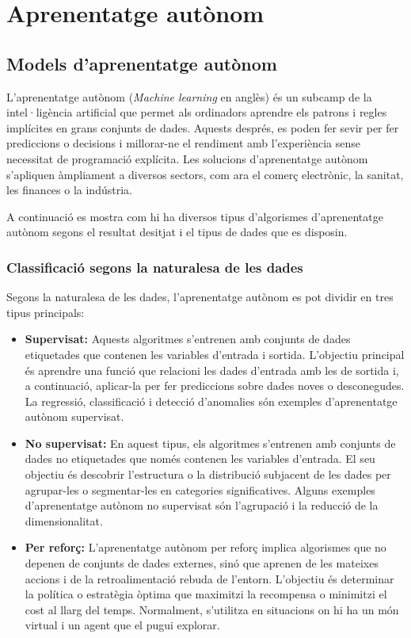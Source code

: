 \section{Aprenentatge autònom}

\subsection{Models d'aprenentatge autònom}
L'aprenentatge autònom (\textit{Machine learning} en anglès) és un subcamp de la intel·ligència artificial que permet als ordinadors aprendre els patrons i regles implícites en grans conjunts de dades. Aquests després, es poden fer sevir per fer prediccions o decisions i millorar-ne el rendiment amb l'experiència sense necessitat de programació explícita. Les solucions d'aprenentatge autònom s'apliquen àmpliament a diversos sectors, com ara el comerç electrònic, la sanitat, les finances o la indústria.

A continuació es mostra com hi ha diversos tipus d'algorismes d'aprenentatge autònom segons el resultat desitjat i el tipus de dades que es disposin.

\subsubsection{Classificació segons la naturalesa de les dades}
Segons la naturalesa de les dades, l'aprenentatge autònom es pot dividir en tres tipus principals: 
\begin{itemize}
    \item \textbf{Supervisat:} Aquests algoritmes s'entrenen amb conjunts de dades etiquetades que contenen les variables d'entrada i sortida. L'objectiu principal és aprendre una funció que relacioni les dades d'entrada amb les de sortida i, a continuació, aplicar-la per fer prediccions sobre dades noves o desconegudes. La regressió, classificació i detecció d'anomalies són exemples d'aprenentatge autònom supervisat.
    \item \textbf{No supervisat:} En aquest tipus, els algoritmes s'entrenen amb conjunts de dades no etiquetades que només contenen les variables d'entrada. El seu objectiu és descobrir l'estructura o la distribució subjacent de les dades per agrupar-les o segmentar-les en categories significatives. Alguns exemples d'aprenentatge autònom no supervisat són l'agrupació i la reducció de la dimensionalitat.
    \item \textbf{Per reforç:} L'aprenentatge autònom per reforç implica algorismes que no depenen de conjunts de dades externes, sinó que aprenen de les mateixes accions i de la retroalimentació rebuda de l'entorn. L'objectiu és determinar la política o estratègia òptima que maximitzi la recompensa o minimitzi el cost al llarg del temps. Normalment, s'utilitza en situacions on hi ha un món virtual i un agent que el pugui explorar.
\end{itemize}

